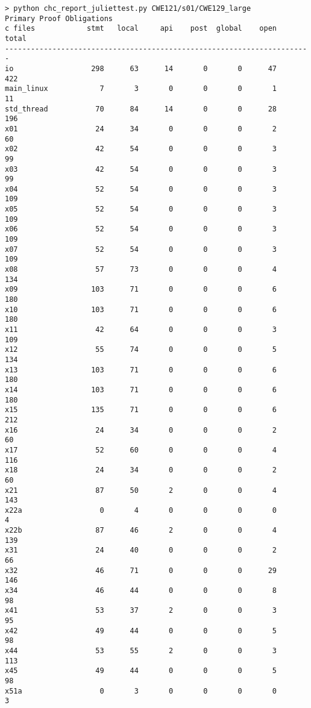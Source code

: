 \documentclass[11pt]{article}
\begin{document}
\begin{small}
\begin{verbatim}
> python chc_report_juliettest.py CWE121/s01/CWE129_large
Primary Proof Obligations
c files            stmt   local     api    post  global    open   total
-----------------------------------------------------------------------
io                  298      63      14       0       0      47     422
main_linux            7       3       0       0       0       1      11
std_thread           70      84      14       0       0      28     196
x01                  24      34       0       0       0       2      60
x02                  42      54       0       0       0       3      99
x03                  42      54       0       0       0       3      99
x04                  52      54       0       0       0       3     109
x05                  52      54       0       0       0       3     109
x06                  52      54       0       0       0       3     109
x07                  52      54       0       0       0       3     109
x08                  57      73       0       0       0       4     134
x09                 103      71       0       0       0       6     180
x10                 103      71       0       0       0       6     180
x11                  42      64       0       0       0       3     109
x12                  55      74       0       0       0       5     134
x13                 103      71       0       0       0       6     180
x14                 103      71       0       0       0       6     180
x15                 135      71       0       0       0       6     212
x16                  24      34       0       0       0       2      60
x17                  52      60       0       0       0       4     116
x18                  24      34       0       0       0       2      60
x21                  87      50       2       0       0       4     143
x22a                  0       4       0       0       0       0       4
x22b                 87      46       2       0       0       4     139
x31                  24      40       0       0       0       2      66
x32                  46      71       0       0       0      29     146
x34                  46      44       0       0       0       8      98
x41                  53      37       2       0       0       3      95
x42                  49      44       0       0       0       5      98
x44                  53      55       2       0       0       3     113
x45                  49      44       0       0       0       5      98
x51a                  0       3       0       0       0       0       3

\end{verbatim}
\end{small}
\end{document}
